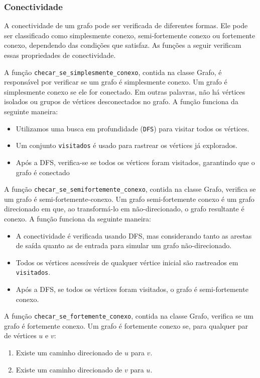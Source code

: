 \documentclass[12pt]{article}
\begin{document}
\subsubsection{Conectividade}

A conectividade de um grafo pode ser verificada de diferentes formas. Ele pode ser classificado como simplesmente conexo, semi-fortemente conexo ou fortemente conexo, dependendo das condições que satisfaz. As funções a seguir verificam essas propriedades de conectividade.

A função \texttt{checar\_se\_simplesmente\_conexo}, contida na classe Grafo, é responsável por verificar se um grafo é simplesmente conexo. Um grafo é simplesmente conexo se ele for conectado. Em outras palavras, não há vértices isolados ou grupos de vértices desconectados no grafo. A função funciona da seguinte maneira:

\begin{itemize}
  \item Utilizamos uma busca em profundidade (\texttt{DFS}) para visitar todos os vértices.
  \item Um conjunto \texttt{visitados} é usado para rastrear os vértices já explorados.
  \item Após a DFS, verifica-se se todos os vértices foram visitados, garantindo que o grafo é conectado
\end{itemize}

A função \texttt{checar\_se\_semifortemente\_conexo}, contida na classe Grafo, verifica se um grafo é semi-fortemente-conexo. Um grafo semi-fortemente conexo é um grafo direcionado em que, ao transformá-lo em não-direcionado, o grafo resultante é conexo. A função funciona da seguinte maneira:

\begin{itemize}
  \item A conectividade é verificada usando DFS, mas considerando tanto as arestas de saída quanto as de entrada para simular um grafo não-direcionado.
  \item Todos os vértices acessíveis de qualquer vértice inicial são rastreados em \texttt{visitados}.
  \item Após a DFS, se todos os vértices foram visitados, o grafo é semi-fortemente conexo.
\end{itemize}

A função \texttt{checar\_se\_fortemente\_conexo}, contida na classe Grafo, verifica se um grafo é fortemente conexo. Um grafo é fortemente conexo se, para qualquer par de vértices \( u \) e \( v \):
\begin{enumerate}
  \item Existe um caminho direcionado de \( u \) para \( v \).
  \item Existe um caminho direcionado de \( v \) para \( u \).
\end{enumerate}
\end{document}
